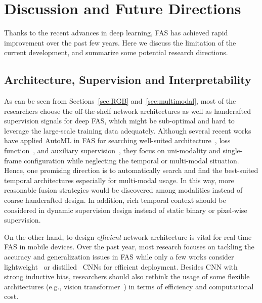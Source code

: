 \documentclass[10pt,journal,compsoc]{IEEEtran}
\begin{document}
\vspace{-0.8em}

\section{Discussion and Future Directions} \label{sec:discussion}

Thanks to the recent advances in deep learning, FAS has achieved rapid improvement over the past few years. Here we discuss the limitation of the current development, and summarize some potential research directions.



\vspace{-0.8em}
\subsection{Architecture, Supervision and Interpretability}
As can be seen from Sections~\ref{sec:RGB} and~\ref{sec:multimodal}, most of the researchers choose the off-the-shelf network architectures as well as handcrafted supervision signals for deep FAS, which might be sub-optimal and hard to leverage the large-scale training data adequately. Although several recent works have applied AutoML in FAS for searching well-suited architecture~\cite{yu2020searching,yu2020fas2}, loss function~\cite{qin2020one}, and auxiliary supervision~\cite{qin2021meta}, they focus on uni-modality and single-frame configuration while neglecting the temporal or multi-modal situation. Hence, one promising direction is to automatically search and find the best-suited temporal architectures especially for multi-modal usage. In this way, more reasonable fusion strategies would be discovered among modalities instead of coarse handcrafted design. In addition, rich temporal context should be considered in dynamic supervision design instead of static binary or pixel-wise supervision.  

On the other hand, to design \textit{efficient} network architecture is vital for real-time FAS in mobile devices. Over the past year, most research focuses on tackling the accuracy and generalization issues in FAS while only a few works consider lightweight~\cite{yu2020auto2} or distilled~\cite{li2020face2} CNNs for efficient deployment. Besides CNN with strong inductive bias, researchers should also rethink the usage of some flexible architectures (e.g., vision transformer~\cite{yu2021transrppg,george2020effectiveness}) in terms of efficiency and computational cost. 
\end{document}
